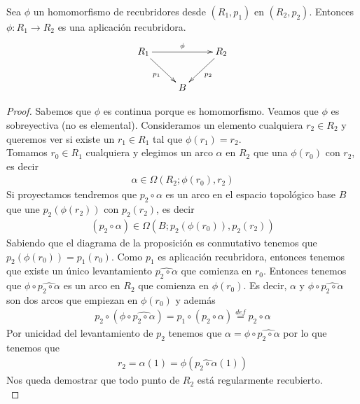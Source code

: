 \begin{prop}
    Sea $\phi$ un homomorfismo de recubridores desde $(R_1,p_1)$ en $(R_2,p_2)$. Entonces $\phi:R_1 \to R_2$ es una aplicación recubridora.
    \begin{gather*}
        \xymatrix{
            R_1 \ar[rr]^{\phi} \ar[dr]_{p_1} && R_2 \ar[dl]^{p_2}\\
            & B
        }
    \end{gather*}
    \begin{proof}
        Sabemos que $\phi$ es continua porque es homomorfismo. Veamos que $\phi$ es sobreyectiva (no es elemental). Consideramos un elemento cualquiera $r_2\in R_2$ y queremos ver si existe un $r_1\in R_1$ tal que $\phi(r_1)=r_2$. \\

        Tomamos $r_0\in R_1$ cualquiera y elegimos un arco $\alpha$ en $R_2$ que una $\phi(r_0)$ con $r_2$, es decir
        \begin{gather*}
            \alpha\in \Omega(R_2; \phi(r_0), r_2)
        \end{gather*}
        Si proyectamos tendremos que $p_2\circ \alpha$ es un arco en el espacio topológico base $B$ que une $p_2(\phi(r_2))$ con $p_2(r_2)$, es decir
        \begin{gather*}
            (p_2\circ \alpha) \in \Omega(B; p_2(\phi(r_0)), p_2(r_2))
        \end{gather*}
        Sabiendo que el diagrama de la proposición es conmutativo tenemos que $p_2(\phi(r_0)) = p_1(r_0)$. Como $p_1$ es aplicación recubridora, entonces tenemos que existe un único levantamiento $\widehat{p_2\circ \alpha}$ que comienza en $r_0$. Entonces tenemos que $\phi \circ \widehat{p_2\circ \alpha}$ es un arco en $R_2$ que comienza en $\phi(r_0)$. Es decir, $\alpha$ y $\phi\circ \widehat{p_2\circ \alpha}$ son dos arcos que empiezan en $\phi(r_0)$ y además
        \begin{gather*}
            p_2\circ(\phi \circ \widehat{p_2 \circ \alpha}) = p_1\circ(\widehat{p_2 \circ \alpha}) \overset{def}{=} p_2\circ \alpha
        \end{gather*}
        Por unicidad del levantamiento de $p_2$ tenemos que $\alpha = \phi \circ \widehat{p_2\circ \alpha}$ por lo que tenemos que 
        \begin{gather*}
            r_2 = \alpha(1) = \phi(\widehat{p_2\circ \alpha}(1))
        \end{gather*}
        Nos queda demostrar que todo punto de $R_2$ está regularmente recubierto.\\


\end{proof}
\end{prop}
